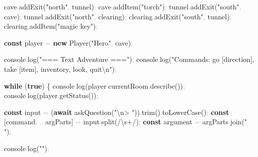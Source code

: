 \documentclass[
  justified,
  openright,
]{tufte-book}
\newcommand{\KeywordTok}[1]{\textcolor{CodeKeyword}{\textbf{#1}}}  %
\newcommand{\StringTok}[1]{\textcolor{CodeString}{#1}}              %
\newcommand{\CodeFuncTok}[1]{\textcolor{CodeKeyword}{#1}}           %
\newcommand{\CodeTypeTok}[1]{\textcolor{CodeType}{#1}}              %
\newcommand{\OperatorTok}[1]{\textcolor{DarkGray}{#1}}              %
\newenvironment{Shaded}{%
  \begin{mdframed}[style=TufteCode]%
}{%
  \end{mdframed}%
}
\begin{document}
\begin{Shaded}
\begin{Highlighting}[]
  cave\OperatorTok{.}\CodeFuncTok{addExit}(\StringTok{"north"}\OperatorTok{,} tunnel)\OperatorTok{;}
  cave\OperatorTok{.}\CodeFuncTok{addItem}(\StringTok{"torch"})\OperatorTok{;}
  tunnel\OperatorTok{.}\CodeFuncTok{addExit}(\StringTok{"south"}\OperatorTok{,} cave)\OperatorTok{;}
  tunnel\OperatorTok{.}\CodeFuncTok{addExit}(\StringTok{"north"}\OperatorTok{,} clearing)\OperatorTok{;}
  clearing\OperatorTok{.}\CodeFuncTok{addExit}(\StringTok{"south"}\OperatorTok{,} tunnel)\OperatorTok{;}
  clearing\OperatorTok{.}\CodeFuncTok{addItem}(\StringTok{"magic key"})\OperatorTok{;}
 
  \KeywordTok{const} player \OperatorTok{=} \KeywordTok{new} \CodeFuncTok{Player}(\StringTok{"Hero"}\OperatorTok{,} cave)\OperatorTok{;}
 
  console\OperatorTok{.}\CodeFuncTok{log}(\StringTok{"=== Text Adventure ==="})\OperatorTok{;}
  console\OperatorTok{.}\CodeFuncTok{log}(\StringTok{"Commands: go [direction], take [item], inventory, look, quit}\StringTok{\textbackslash{}n}\StringTok{"})\OperatorTok{;}
 
  \KeywordTok{while} (\KeywordTok{true}) \{
    console\OperatorTok{.}\CodeFuncTok{log}(player\OperatorTok{.}\CodeTypeTok{currentRoom}\OperatorTok{.}\CodeFuncTok{describe}())\OperatorTok{;}
    console\OperatorTok{.}\CodeFuncTok{log}(player\OperatorTok{.}\CodeFuncTok{getStatus}())\OperatorTok{;}
 
    \KeywordTok{const} input \OperatorTok{=} (\KeywordTok{await} \CodeFuncTok{askQuestion}(\StringTok{"}\StringTok{\textbackslash{}n}\StringTok{\textgreater{} "}))\OperatorTok{.}\CodeFuncTok{trim}()\OperatorTok{.}\CodeFuncTok{toLowerCase}()\OperatorTok{;}
    \KeywordTok{const} [command\OperatorTok{,} \OperatorTok{...}argParts] \OperatorTok{=} input\OperatorTok{.}\CodeFuncTok{split}(\StringTok{/}\StringTok{\textbackslash{}s+}\StringTok{/})\OperatorTok{;}
    \KeywordTok{const} argument \OperatorTok{=} argParts\OperatorTok{.}\CodeFuncTok{join}(\StringTok{" "})\OperatorTok{;}
 
    console\OperatorTok{.}\CodeFuncTok{log}(\StringTok{""})\OperatorTok{;}
 

\end{Highlighting}
\end{Shaded}
\end{document}
